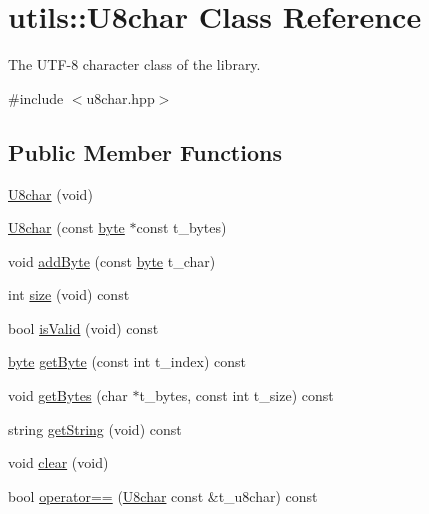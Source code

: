 \hypertarget{classutils_1_1U8char}{}\section{utils\+:\+:U8char Class Reference}
\label{classutils_1_1U8char}


The U\+T\+F-\/8 character class of the library.  




{\ttfamily \#include $<$u8char.\+hpp$>$}

\subsection*{Public Member Functions}
\begin{DoxyCompactItemize}
\item 
\hyperlink{classutils_1_1U8char_a2d500aa5e968fd99c6bd4012f63c54c5}{U8char} (void)
\item 
\hyperlink{classutils_1_1U8char_a68db482bb7267ce30adff8e5ae8e18ad}{U8char} (const \hyperlink{namespaceutils_a6ec9293c5f79998946269edb0f6bc028}{byte} $\ast$const t\+\_\+bytes)
\item 
void \hyperlink{classutils_1_1U8char_a749ac883897f455715be1083ed1c80dd}{add\+Byte} (const \hyperlink{namespaceutils_a6ec9293c5f79998946269edb0f6bc028}{byte} t\+\_\+char)
\item 
int \hyperlink{classutils_1_1U8char_a493954b5b9a0bcad32f55a67ec2c4de1}{size} (void) const
\item 
bool \hyperlink{classutils_1_1U8char_af33db5c6613954da27e484af82217feb}{is\+Valid} (void) const
\item 
\hyperlink{namespaceutils_a6ec9293c5f79998946269edb0f6bc028}{byte} \hyperlink{classutils_1_1U8char_af23db23219f81cfcc9424a7dbde981d9}{get\+Byte} (const int t\+\_\+index) const
\item 
void \hyperlink{classutils_1_1U8char_a9bf39a597d04b56faac3325eebf49b39}{get\+Bytes} (char $\ast$t\+\_\+bytes, const int t\+\_\+size) const
\item 
string \hyperlink{classutils_1_1U8char_a234c21cc7b616c9d5f249badf1ba33b2}{get\+String} (void) const
\item 
void \hyperlink{classutils_1_1U8char_a682d09b6d41f3127f9da3be977aba230}{clear} (void)
\item 
bool \hyperlink{classutils_1_1U8char_a469ba19fd42df808d0fc4927bb33d81b}{operator==} (\hyperlink{classutils_1_1U8char}{U8char} const \&t\+\_\+u8char) const
\item 

\end{DoxyCompactItemize}
